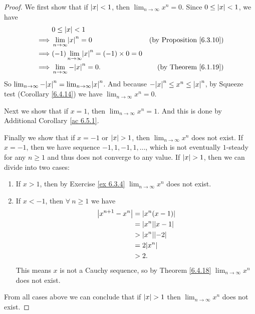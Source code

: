 \begin{proof}
We first show that if \(\abs*{x} < 1\), then \(\lim_{n \to \infty} x^n = 0\).
Since \(0 \leq \abs*{x} < 1\), we have
\begin{align*}
& 0 \leq \abs*{x} < 1 \\
\implies & \lim_{n \to \infty} \abs*{x}^n = 0 & \text{(by Proposition \ref{6.3.10})} \\
\implies & (-1)\lim_{n \to \infty} \abs*{x}^n = (-1) \times 0 = 0 \\
\implies & \lim_{n \to \infty} -\abs*{x}^n = 0. & \text{(by Theorem \ref{6.1.19})}
\end{align*}
So \(\lim_{n \to \infty} -\abs*{x}^n = \lim_{n \to \infty} \abs*{x}^n\).
And because \(-\abs*{x}^n \leq x^n \leq \abs*{x}^n\), by Squeeze test (Corollary \ref{6.4.14}) we have \(\lim_{n \to \infty} x^n = 0\).

Next we show that if \(x = 1\), then \(\lim_{n \to \infty} x^n = 1\).
And this is done by Additional Corollary \ref{ac 6.5.1}.

Finally we show that if \(x = -1\) or \(\abs*{x} > 1\), then \(\lim_{n \to \infty} x^n\) does not exist.
If \(x = -1\), then we have sequence \(-1, 1, -1, 1, \dots\), which is not eventually \(1\)-steady for any \(n \geq 1\) and thus does not converge to any value.
If \(\abs*{x} > 1\), then we can divide into two cases:
\begin{enumerate}
    \item If \(x > 1\), then by Exercise \ref{ex 6.3.4} \(\lim_{n \to \infty} x^n\) does not exist.
    \item If \(x < -1\), then \(\forall\ n \geq 1\) we have
    \begin{align*}
        \abs*{x^{n + 1} - x^n} &= \abs*{x^n(x - 1)} \\
        &= \abs*{x^n}\abs*{x - 1} \\
        &> \abs*{x^n}\abs*{-2} \\
        &= 2\abs*{x^n} \\
        &> 2.
    \end{align*}
    This means \(x\) is not a Cauchy sequence, so by Theorem \ref{6.4.18} \(\lim_{n \to \infty} x^n\) does not exist.
\end{enumerate}
From all cases above we can conclude that if \(\abs*{x} > 1\) then \(\lim_{n \to \infty} x^n\) does not exist.
\end{proof}
